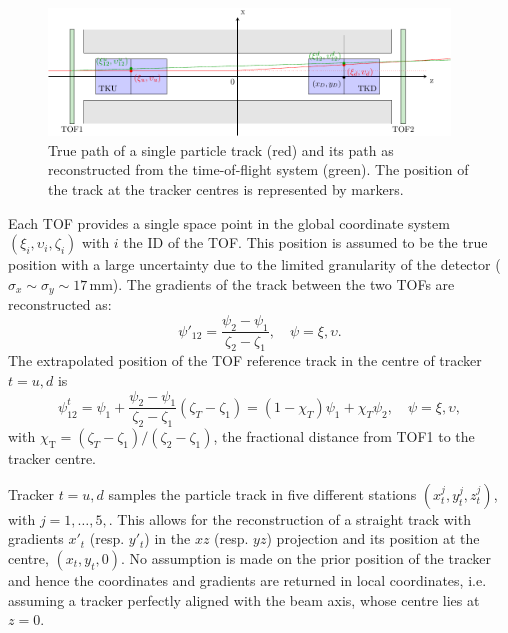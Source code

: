 \begin{figure}
	\begin{center}
		\includegraphics[width=0.95\textwidth]{alignment.pdf}
	\end{center}
	\caption{
		True path of a single particle track (red) and its path as reconstructed from the time-of-flight system (green). The position of the track at the tracker centres is represented by markers.
	}
	\label{Fig:AbsorberVessel:BdyPhoto}
\end{figure}

Each TOF provides a single space point in the global coordinate system $(\xi_i, \upsilon_i, \zeta_i)$ with $i$ the ID of the TOF. This position is assumed to be the true position with a large uncertainty due to the limited granularity of the detector ($\sigma_x\sim\sigma_y\sim17$\,mm). The gradients of the track between the two TOFs are reconstructed as:
\begin{equation}
\psi'_{12}=\frac{\psi_2-\psi_1}{\zeta_2-\zeta_1},\quad\psi=\xi,\upsilon.
\end{equation}
The extrapolated position of the TOF reference track in the centre of tracker $t=u,d$ is
\begin{equation}
\psi_{12}^t=\psi_1+\frac{\psi_2-\psi_1}{\zeta_2-\zeta_1}(\zeta_T-\zeta_1)=(1-\chi_T)\psi_1+\chi_T\psi_2,\quad\psi=\xi,\upsilon,
\end{equation}
with $\chi_\mathrm{T}=(\zeta_T-\zeta_1)/(\zeta_2-\zeta_1)$, the fractional distance from TOF1 to the tracker centre.

Tracker $t=u,d$ samples the particle track in five different stations $(x_t^j, y_t^j, z_t^j)$, with $j=1,\dots,5,$. This allows for the reconstruction of a straight track with gradients $x'_t$ (resp. $y'_t$) in the $xz$ (resp. $yz$) projection and its position at the centre, $(x_t, y_t, 0)$. No assumption is made on the prior position of the tracker and hence the coordinates and gradients are returned in local coordinates, i.e. assuming a tracker perfectly aligned with the beam axis, whose centre lies at $z=0$.

